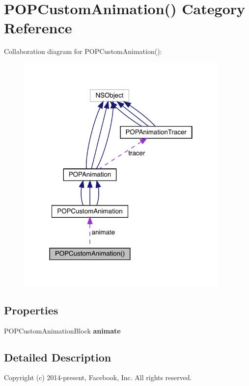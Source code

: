 \hypertarget{category_p_o_p_custom_animation_07_08}{}\section{P\+O\+P\+Custom\+Animation() Category Reference}
\label{category_p_o_p_custom_animation_07_08}


Collaboration diagram for P\+O\+P\+Custom\+Animation()\+:\nopagebreak
\begin{figure}[H]
\begin{center}
\leavevmode
\includegraphics[width=297pt]{category_p_o_p_custom_animation_07_08__coll__graph}
\end{center}
\end{figure}
\subsection*{Properties}
\begin{DoxyCompactItemize}
\item 
\mbox{\label{category_p_o_p_custom_animation_07_08_a23dccfb6be6ee06e431c301a280b8863}} 
P\+O\+P\+Custom\+Animation\+Block {\bfseries animate}
\end{DoxyCompactItemize}


\subsection{Detailed Description}
Copyright (c) 2014-\/present, Facebook, Inc. All rights reserved.

